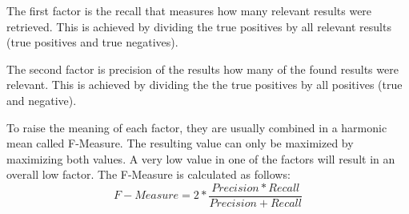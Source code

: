 The first factor is the recall that measures how many relevant results were retrieved. 
This is achieved by dividing the true positives by all relevant results (true positives and true negatives).

The second factor is precision of the results how many of the found results were relevant. 
This is achieved by dividing the the true positives by all positives (true and negative).

To raise the meaning of each factor, they are usually combined in a harmonic mean called F-Measure. 
The resulting value can only be maximized by maximizing both values. 
A very low value in one of the factors will result in an overall low factor. 
The F-Measure is calculated as follows: 
\[
F-Measure = 2*\frac{Precision*Recall}{Precision+Recall}
\]

